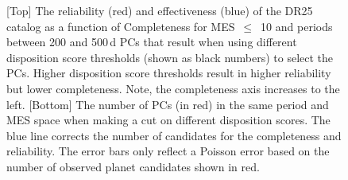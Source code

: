 \begin{figure}[htb]
\begin{center}
\begin{tabular}{c}
  \end{tabular}
  \caption{\label{f:adjscore}[Top] The reliability (red) and effectiveness (blue) of the DR25 catalog as a function of Completeness for MES~$\leq$~10 and periods between 200 and 500\,d PCs that result when using different disposition score thresholds (shown as black numbers) to select the PCs. Higher disposition score thresholds result in higher reliability but lower completeness. Note, the completeness axis increases to the left.  [Bottom] The number of PCs (in red) in the same period and MES space when making a cut on different disposition scores.  The blue line corrects the number of candidates for the completeness and reliability. The error bars only reflect a Poisson error based on the number of observed planet candidates shown in red.}
 \end{center}
 \end{figure}



